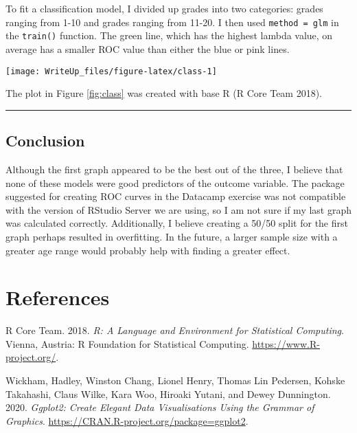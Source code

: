 \documentclass[
]{article}
\begin{document}
To fit a classification model, I divided up grades into two categories: grades ranging from 1-10 and grades ranging from 11-20. I then used \texttt{method\ =\ glm} in the \texttt{train()} function. The green line, which has the highest lambda value, on average has a smaller ROC value than either the blue or pink lines.

\begin{center}\texttt{[image: WriteUp\_files/figure-latex/class-1]} \end{center}

The plot in Figure \ref{fig:class} was created with base R (R Core Team 2018).

\begin{center}\rule{0.5\linewidth}{0.5pt}\end{center}

\hypertarget{conclusion}{%
\subsection*{Conclusion}\label{conclusion}}

Although the first graph appeared to be the best out of the three, I believe that none of these models were good predictors of the outcome variable. The package suggested for creating ROC curves in the Datacamp exercise was not compatible with the version of RStudio Server we are using, so I am not sure if my last graph was calculated correctly. Additionally, I believe creating a 50/50 split for the first graph perhaps resulted in overfitting. In the future, a larger sample size with a greater age range would probably help with finding a greater effect.

\hypertarget{references}{%
\section*{References}\label{references}}

\hypertarget{refs}{}
\leavevmode\hypertarget{ref-R-base}{}%
R Core Team. 2018. \emph{R: A Language and Environment for Statistical Computing}. Vienna, Austria: R Foundation for Statistical Computing. \url{https://www.R-project.org/}.

\leavevmode\hypertarget{ref-R-ggplot2}{}%
Wickham, Hadley, Winston Chang, Lionel Henry, Thomas Lin Pedersen, Kohske Takahashi, Claus Wilke, Kara Woo, Hiroaki Yutani, and Dewey Dunnington. 2020. \emph{Ggplot2: Create Elegant Data Visualisations Using the Grammar of Graphics}. \url{https://CRAN.R-project.org/package=ggplot2}.
\end{document}
